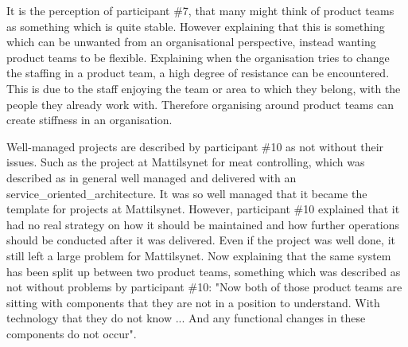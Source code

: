 
It is the perception of participant \#7, that many might think of product teams as something which is quite stable. However explaining that this is something which can be unwanted from an organisational perspective, instead wanting product teams to be flexible. Explaining when the organisation tries to change the staffing in a product team, a high degree of resistance can be encountered. This is due to the staff enjoying the team or area to which they belong, with the people they already work with. Therefore organising around product teams can create stiffness in an organisation.



Well-managed projects are described by participant \#10 as not without their issues. Such as the project at Mattilsynet for meat controlling, which was described as in general well managed and delivered with an \gls{service_oriented_architecture}. It was so well managed that it became the template for projects at Mattilsynet. However, participant \#10 explained that it had no real strategy on how it should be maintained and how further operations should be conducted after it was delivered. Even if the project was well done, it still left a large problem for Mattilsynet. Now explaining that the same system has been split up between two product teams, something which was described as not without problems by participant \#10: "Now both of those product teams are sitting with components that they are not in a position to understand. With technology that they do not know ... And any functional changes in these components do not occur".

